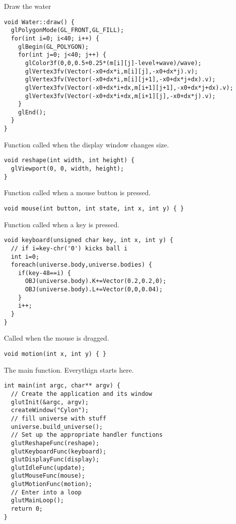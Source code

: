 Draw the water
\begin{lstlisting}
void Water::draw() {
  glPolygonMode(GL_FRONT,GL_FILL);
  for(int i=0; i<40; i++) {
    glBegin(GL_POLYGON);
    for(int j=0; j<40; j++) {
      glColor3f(0,0,0.5+0.25*(m[i][j]-level+wave)/wave);
      glVertex3fv(Vector(-x0+dx*i,m[i][j],-x0+dx*j).v);
      glVertex3fv(Vector(-x0+dx*i,m[i][j+1],-x0+dx*j+dx).v);
      glVertex3fv(Vector(-x0+dx*i+dx,m[i+1][j+1],-x0+dx*j+dx).v);
      glVertex3fv(Vector(-x0+dx*i+dx,m[i+1][j],-x0+dx*j).v);
    }
    glEnd();
  }      
}
\end{lstlisting}

Function called when the display window changes size.
\begin{lstlisting}
void reshape(int width, int height) {
  glViewport(0, 0, width, height);
}
\end{lstlisting}

Function called when a mouse button is pressed.
\begin{lstlisting}
void mouse(int button, int state, int x, int y) { }
\end{lstlisting}

Function called when a key is pressed.
\begin{lstlisting}
void keyboard(unsigned char key, int x, int y) {
  // if i=key-chr('0') kicks ball i
  int i=0;
  foreach(universe.body,universe.bodies) {
    if(key-48==i) {    
      OBJ(universe.body).K+=Vector(0.2,0.2,0);
      OBJ(universe.body).L+=Vector(0,0,0.04);
    }
    i++;
  }
}
\end{lstlisting}

Called when the mouse is dragged.
\begin{lstlisting}
void motion(int x, int y) { }
\end{lstlisting}

The main function. Everythign starts here.
\begin{lstlisting}
int main(int argc, char** argv) {
  // Create the application and its window
  glutInit(&argc, argv);
  createWindow("Cylon");
  // fill universe with stuff
  universe.build_universe();
  // Set up the appropriate handler functions
  glutReshapeFunc(reshape);
  glutKeyboardFunc(keyboard);
  glutDisplayFunc(display);
  glutIdleFunc(update);
  glutMouseFunc(mouse);
  glutMotionFunc(motion);  
  // Enter into a loop
  glutMainLoop();  
  return 0;
}
\end{lstlisting}
